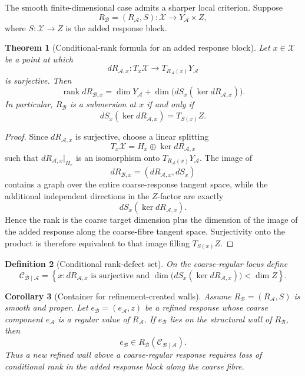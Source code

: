 \documentclass[11pt]{article}
\newtheorem{definition}{Definition}[section]
\newtheorem{theorem}[definition]{Theorem}
\newtheorem{corollary}[definition]{Corollary}
\newcommand{\X}{\mathcal X}
\newcommand{\Acal}{\mathcal A}
\newcommand{\Bcal}{\mathcal B}
\begin{document}
The smooth finite-dimensional case admits a sharper local criterion. Suppose
\[
R_{\Bcal}=(R_{\Acal},S):\X\to Y_{\Acal}\times Z,
\]
where \(S:\X\to Z\) is the added response block.

\begin{theorem}[Conditional-rank formula for an added response block]
\label{thm:conditional-rank}
Let \(x\in\X\) be a point at which
\[
dR_{\Acal,x}:T_x\X\to T_{R_{\Acal}(x)}Y_{\Acal}
\]
is surjective. Then
\[
\operatorname{rank}dR_{\Bcal,x}
=
\dim Y_{\Acal}
+
\dim\bigl(dS_x(\ker dR_{\Acal,x})\bigr).
\]
In particular, \(R_{\Bcal}\) is a submersion at \(x\) if and only if
\[
dS_x(\ker dR_{\Acal,x})=T_{S(x)}Z.
\]
\end{theorem}

\begin{proof}
Since \(dR_{\Acal,x}\) is surjective, choose a linear splitting
\[
T_x\X=H_x\oplus\ker dR_{\Acal,x}
\]
such that \(dR_{\Acal,x}|_{H_x}\) is an isomorphism onto
\(T_{R_{\Acal}(x)}Y_{\Acal}\). The image of
\[
dR_{\Bcal,x}=(dR_{\Acal,x},dS_x)
\]
contains a graph over the entire coarse-response tangent space, while the
additional independent directions in the \(Z\)-factor are exactly
\[
dS_x(\ker dR_{\Acal,x}).
\]
Hence the rank is the coarse target dimension plus the dimension of the image
of the added response along the coarse-fibre tangent space. Surjectivity onto
the product is therefore equivalent to that image filling \(T_{S(x)}Z\).
\end{proof}

\begin{definition}[Conditional rank-defect set]
On the coarse-regular locus define
\[
\mathcal C_{\Bcal\mid\Acal}
=
\left\{
x:
dR_{\Acal,x}\text{ is surjective and }
\dim\bigl(dS_x(\ker dR_{\Acal,x})\bigr)
<\dim Z
\right\}.
\]
\end{definition}

\begin{corollary}[Container for refinement-created walls]
\label{cor:new-wall-container}
Assume \(R_{\Bcal}=(R_{\Acal},S)\) is smooth and proper. Let
\(e_{\Bcal}=(e_{\Acal},z)\) be a refined response whose coarse component
\(e_{\Acal}\) is a regular value of \(R_{\Acal}\). If
\(e_{\Bcal}\) lies on the structural wall of \(R_{\Bcal}\), then
\[
e_{\Bcal}\in
R_{\Bcal}(\mathcal C_{\Bcal\mid\Acal}).
\]
Thus a new refined wall above a coarse-regular response requires loss of
conditional rank in the added response block along the coarse fibre.
\end{corollary}
\end{document}
